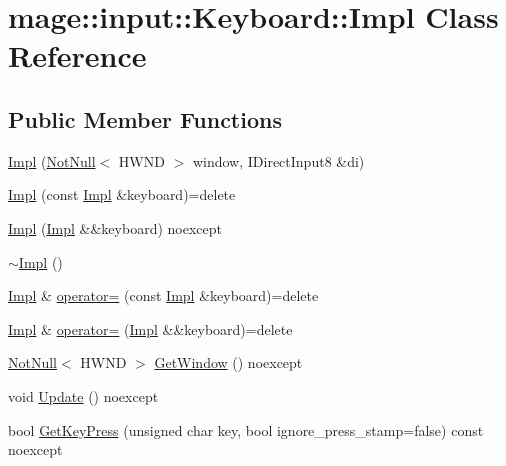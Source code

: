 \hypertarget{classmage_1_1input_1_1_keyboard_1_1_impl}{}\section{mage\+:\+:input\+:\+:Keyboard\+:\+:Impl Class Reference}
\label{classmage_1_1input_1_1_keyboard_1_1_impl}
\subsection*{Public Member Functions}
\begin{DoxyCompactItemize}
\item 
\mbox{\hyperlink{classmage_1_1input_1_1_keyboard_1_1_impl_a07a7e889342075f32d2484e8f0a6006f}{Impl}} (\mbox{\hyperlink{namespacemage_a8769f9d670d6b585ea306cb1062af94b}{Not\+Null}}$<$ H\+W\+ND $>$ window, I\+Direct\+Input8 \&di)
\item 
\mbox{\hyperlink{classmage_1_1input_1_1_keyboard_1_1_impl_ac92f74e73ebe37b9ad539f196cb46876}{Impl}} (const \mbox{\hyperlink{classmage_1_1input_1_1_keyboard_1_1_impl}{Impl}} \&keyboard)=delete
\item 
\mbox{\hyperlink{classmage_1_1input_1_1_keyboard_1_1_impl_a97c9edb077833236e8c2f085d5ad02cc}{Impl}} (\mbox{\hyperlink{classmage_1_1input_1_1_keyboard_1_1_impl}{Impl}} \&\&keyboard) noexcept
\item 
\mbox{\hyperlink{classmage_1_1input_1_1_keyboard_1_1_impl_a928136f9bba9126b3cc861f05ec07675}{$\sim$\+Impl}} ()
\item 
\mbox{\hyperlink{classmage_1_1input_1_1_keyboard_1_1_impl}{Impl}} \& \mbox{\hyperlink{classmage_1_1input_1_1_keyboard_1_1_impl_adf6d3d47c39fbef1ee288aeeda5c55a0}{operator=}} (const \mbox{\hyperlink{classmage_1_1input_1_1_keyboard_1_1_impl}{Impl}} \&keyboard)=delete
\item 
\mbox{\hyperlink{classmage_1_1input_1_1_keyboard_1_1_impl}{Impl}} \& \mbox{\hyperlink{classmage_1_1input_1_1_keyboard_1_1_impl_adb53a165dcaf0e28ea51a64f40dcd482}{operator=}} (\mbox{\hyperlink{classmage_1_1input_1_1_keyboard_1_1_impl}{Impl}} \&\&keyboard)=delete
\item 
\mbox{\hyperlink{namespacemage_a8769f9d670d6b585ea306cb1062af94b}{Not\+Null}}$<$ H\+W\+ND $>$ \mbox{\hyperlink{classmage_1_1input_1_1_keyboard_1_1_impl_a7f27872bdc2f1bfbe87ee4de083597d5}{Get\+Window}} () noexcept
\item 
void \mbox{\hyperlink{classmage_1_1input_1_1_keyboard_1_1_impl_a94276b53e2160e2d191c405f858a76ba}{Update}} () noexcept
\item 
bool \mbox{\hyperlink{classmage_1_1input_1_1_keyboard_1_1_impl_a61f6709d4877d7e6b6a6820814dc6ccf}{Get\+Key\+Press}} (unsigned char key, bool ignore\+\_\+press\+\_\+stamp=false) const noexcept
\end{DoxyCompactItemize}
